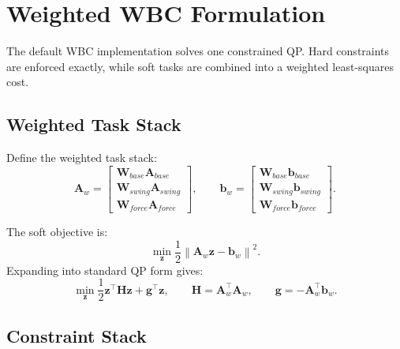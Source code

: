 \documentclass[11pt,a4paper]{article}
\newcommand{\norm}[1]{\left\| #1 \right\|}
\begin{document}

\section{Weighted WBC Formulation}
\label{sec:weighted_wbc}

The default WBC implementation solves one constrained QP. Hard constraints are enforced exactly, while soft tasks are combined into a weighted least-squares cost.

\subsection{Weighted Task Stack}

Define the weighted task stack:
\begin{equation}
	\bm{A}_w
	=
	\begin{bmatrix}
		\bm{W}_{base}\bm{A}_{base}\\
		\bm{W}_{swing}\bm{A}_{swing}\\
		\bm{W}_{force}\bm{A}_{force}
	\end{bmatrix},
	\qquad
	\bm{b}_w
	=
	\begin{bmatrix}
		\bm{W}_{base}\bm{b}_{base}\\
		\bm{W}_{swing}\bm{b}_{swing}\\
		\bm{W}_{force}\bm{b}_{force}
	\end{bmatrix}.
\end{equation}

The soft objective is:
\begin{equation}
	\min_{\bm{z}}
	\frac{1}{2}
	\norm{\bm{A}_w\bm{z}-\bm{b}_w}^2.
\end{equation}
Expanding into standard QP form gives:
\begin{equation}
	\min_{\bm{z}}
	\frac{1}{2}\bm{z}^{\top}\bm{H}\bm{z}
	+
	\bm{g}^{\top}\bm{z},
	\qquad
	\bm{H}=\bm{A}_w^{\top}\bm{A}_w,
	\qquad
	\bm{g}=-\bm{A}_w^{\top}\bm{b}_w.
\end{equation}

\subsection{Constraint Stack}
\end{document}
